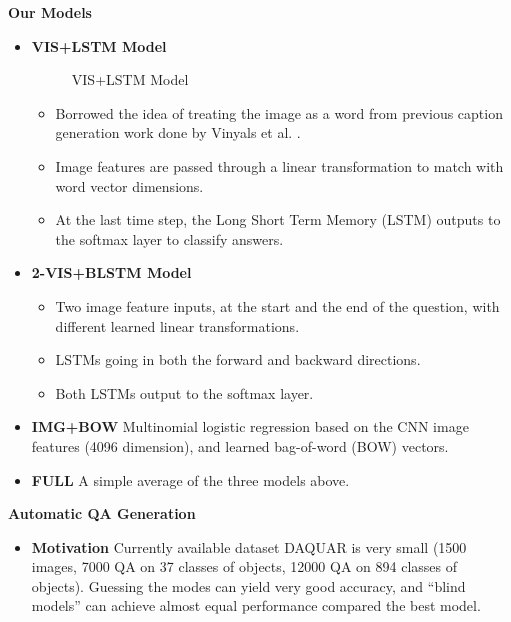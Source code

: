 \documentclass[serif,mathserif,final]{beamer}
\renewcommand{\*}[1]{\textbf{#1}}
\begin{document}
\begin{frame}{}
\begin{columns}[t]
\begin{column}{0.32\linewidth}
\begin{block}{\bf{\large Our Models}}
  \begin{itemize}
  \item \*{VIS+LSTM Model}
  \begin{figure}[t!]
  \centering
  \small
  \scalebox{1.0}{
  }
  \caption{VIS+LSTM Model}
  \label{fig:imgword}
  \end{figure}
  \begin{itemize}
  \item Borrowed the idea of treating the image as a word from previous caption 
  generation work done by Vinyals et al. \cite{vinyals14}. 
  \item Image features are passed through a linear transformation to match with 
  word vector dimensions.
  \item At the last time step, the Long Short Term Memory (LSTM) 
  \cite{hochreiter97} outputs to the softmax layer to classify answers.
  \end{itemize}
  \item \*{2-VIS+BLSTM Model}
  \begin{itemize}
  \item Two image feature inputs, at the start and the end of the question, with different learned linear transformations.
  \item LSTMs going in both the forward and backward directions. 
  \item Both LSTMs output to the softmax layer.
  \end{itemize}
  \item \*{IMG+BOW} Multinomial logistic regression based on the CNN image features (4096 dimension), and learned bag-of-word (BOW) vectors.
  \item \*{FULL} A simple average of the three models above.
  \end{itemize}
\end{block}
\vfill

\begin{block}{\bf{\large Automatic QA Generation}}  
  \begin{itemize}
    \item {\bf{Motivation}} Currently available dataset DAQUAR \cite{mal14a} is 
    very small (1500 images, 7000 QA on 37 classes of objects, 12000 QA on 894 
    classes of objects). Guessing the modes can yield very good accuracy, and 
    ``blind models'' can achieve almost equal performance compared the best 
    model.
  \end{itemize}
\end{block}


\end{column}
\end{columns}
\end{frame}
\end{document}

